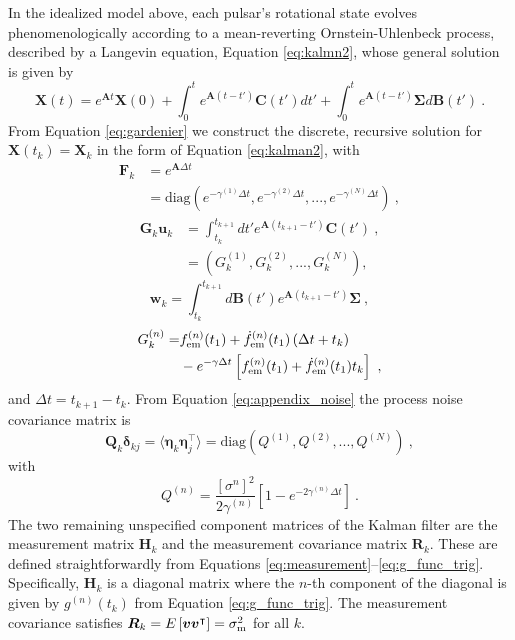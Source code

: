 \documentclass[fleqn,usenatbib,useAMS]{mnras}
\begin{document}
In the idealized model above, each pulsar's rotational state evolves phenomenologically according to a mean-reverting Ornstein-Uhlenbeck process, described by a Langevin equation, Equation \eqref{eq:kalmn2}, whose general solution is given by \citep{gardiner2009stochastic}
\begin{equation}
	\boldsymbol{X}(t) = e^{\boldsymbol{A} t} \boldsymbol{X}(0) + \int_0^t e^{\boldsymbol{A}(t-t')} \boldsymbol{C}(t') dt' + \int_0^t e^{\boldsymbol{A}(t-t')} \boldsymbol{\Sigma} d\boldsymbol{B}(t') \ . \label{eq:gardenier}
\end{equation} 
From Equation \eqref{eq:gardenier} we construct the discrete, recursive solution for $\boldsymbol{X}(t_k) = \boldsymbol{X}_k$ in the form of Equation \eqref{eq:kalman2}, with
\begin{align}
	\boldsymbol{F}_k &= e^{\boldsymbol{A} \Delta t } \  \\
	&= \text{diag}\left(e^{- \gamma^{(1)} \Delta t},e^{- \gamma^{(2)} \Delta t},...,e^{- \gamma^{(N)} \Delta t} \right) \ ,
\end{align}
\begin{align}
	\boldsymbol{G}_k \boldsymbol{u}_k &= \int_{t_k}^{t_{k+1}} dt' e^{\boldsymbol{A}\left( t_{k+1} - t' \right)}  \boldsymbol{C}(t')  \ , \\
	&= \left(G^{(1)}_k, G^{(2)}_k,...,G^{(N)}_k \right) ,
\end{align}
\begin{equation}
	\boldsymbol{w}_k = \int_{t_k}^{t_{k+1}} d \boldsymbol{B}(t') e^{\boldsymbol{A}\left( t_{k+1} - t' \right)} \boldsymbol{\Sigma}  \ ,  \label{eq:appendix_noise}
\end{equation}
\begin{align}
	G_k^{(n)} =&    f^{(n)}_{\rm em}(t_1) + \dot{f}^{(n)}_{\rm em}(t_1)  \left(\Delta t + t_k \right) \nonumber \\ 
	&- e^{-\gamma \Delta t} \left[  f^{(n)}_{\rm em}(t_1) +\dot{f}^{(n)}_{\rm em}(t_1)  t_k \right] \ ,
\end{align}
and $\Delta t = t_{k+1} - t_k$. From Equation \eqref{eq:appendix_noise} the process noise covariance matrix is
\begin{equation}
	\boldsymbol{Q}_k \boldsymbol{\delta}_{kj}= \langle \boldsymbol{\eta}_k \boldsymbol{\eta}_j^\intercal \rangle = \text{diag} \left(Q^{(1)}, Q^{(2)},...,Q^{(N)}\right) \ ,
\end{equation}
with 
\begin{equation}
Q^{(n)} = \frac{[\sigma^{n}]^2}{2 \gamma^{(n)}} \left[ 1 - e^{-2 \gamma^{(n)} \Delta t}\right] \ .
\end{equation}
The two remaining unspecified component matrices of the Kalman filter are the measurement matrix $\boldsymbol{H}_k$ and the measurement covariance matrix $\boldsymbol{R}_k$. These are defined straightforwardly from Equations \eqref{eq:measurement}--\eqref{eq:g_func_trig}. Specifically, 
$\boldsymbol{H}_k$ is a diagonal matrix where the $n$-th component of the diagonal is given by $g^{(n)}(t_k)$ from Equation \eqref{eq:g_func_trig}. The measurement covariance satisfies $\boldsymbol{R}_k = E \left[ \boldsymbol{v} \boldsymbol{v}^\intercal \right] = \sigma^2_{\rm m}$ for all $k$.
\end{document}
